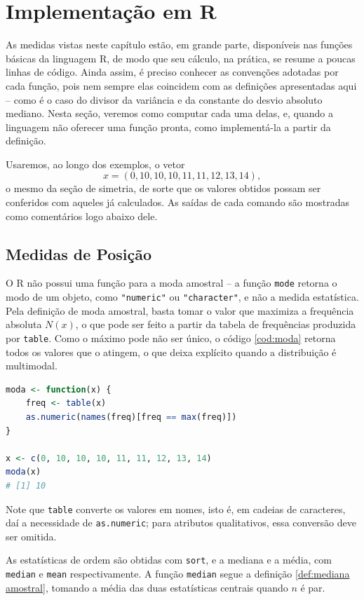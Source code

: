\section{Implementação em R}
\label{sec:medidas em r}

As medidas vistas neste capítulo estão, em grande parte, disponíveis nas funções básicas
da linguagem R, de modo que seu cálculo, na prática, se resume a poucas linhas de código.
Ainda assim, é preciso conhecer as convenções adotadas por cada função, pois nem sempre
elas coincidem com as definições apresentadas aqui -- como é o caso do divisor da
variância e da constante do desvio absoluto mediano.
Nesta seção, veremos como computar cada uma delas, e, quando a linguagem não oferecer uma
função pronta, como implementá-la a partir da definição.

Usaremos, ao longo dos exemplos, o vetor
\[
    x = (0, 10, 10, 10, 11, 11, 12, 13, 14),
\]
o mesmo da seção de simetria, de sorte que os valores obtidos possam ser conferidos com
aqueles já calculados.
As saídas de cada comando são mostradas como comentários logo abaixo dele.

\subsection{Medidas de Posição}

O R não possui uma função para a moda amostral -- a função \texttt{mode} retorna o modo de um objeto,
como \texttt{"numeric"} ou \texttt{"character"}, e não a medida estatística.
Pela definição de moda amostral, basta tomar o valor que maximiza a frequência
absoluta $N(x)$, o que pode ser feito a partir da tabela de frequências produzida por
\texttt{table}.
Como o máximo pode não ser único, o código \ref{cod:moda} retorna todos os valores que o
atingem, o que deixa explícito quando a distribuição é multimodal.

\begin{lstlisting}[language=R, caption={Moda Amostral}, label={cod:moda}]
moda <- function(x) {
    freq <- table(x)
    as.numeric(names(freq)[freq == max(freq)])
}

x <- c(0, 10, 10, 10, 11, 11, 12, 13, 14)
moda(x)
# [1] 10
\end{lstlisting}

Note que \texttt{table} converte os valores em nomes, isto é, em cadeias de caracteres,
daí a necessidade de \texttt{as.numeric}; para atributos qualitativos, essa conversão deve
ser omitida.

As estatísticas de ordem são obtidas com \texttt{sort}, e a mediana e a média, com
\texttt{median} e \texttt{mean} respectivamente.
A função \texttt{median} segue a definição \ref{def:mediana amostral}, tomando a média
das duas estatísticas centrais quando $n$ é par.

